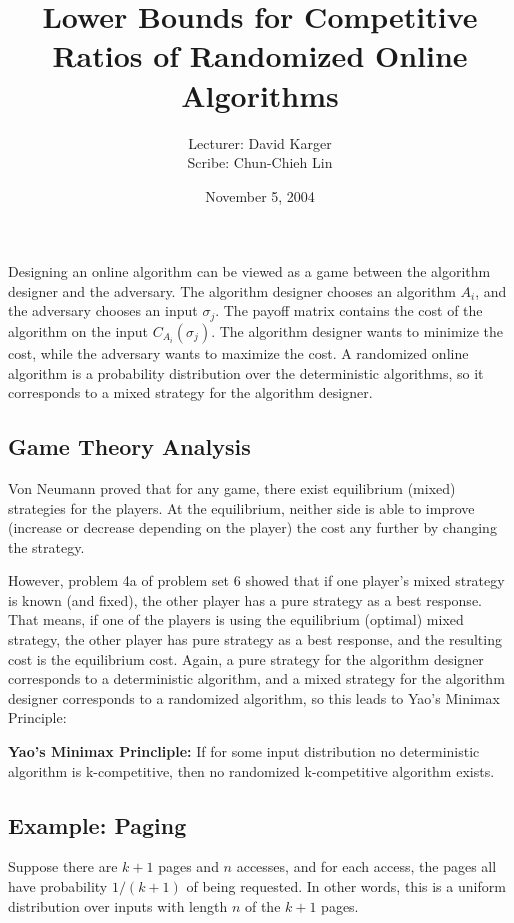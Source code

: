 \documentclass{article}
\title{Lower Bounds for Competitive Ratios of Randomized Online Algorithms}
\date{November 5, 2004}
\author{Lecturer: David Karger\\ Scribe: Chun-Chieh Lin}
\begin{document}
\maketitle

Designing an online algorithm can be viewed as a game between the algorithm designer and the adversary.  The algorithm designer chooses an algorithm $A_i$, and the adversary chooses an input $\sigma_j$.  The payoff matrix contains the cost of the algorithm on the input $C_{A_i}(\sigma_j)$.  The algorithm designer wants to minimize the cost, while the adversary wants to maximize the cost.  A randomized online algorithm is a probability distribution over the deterministic algorithms, so it corresponds to a mixed strategy for the algorithm designer.

\subsection{Game Theory Analysis}

Von Neumann proved that for any game, there exist equilibrium (mixed) strategies for the players.  At the equilibrium, neither side is able to improve (increase or decrease depending on the player) the cost any further by changing the strategy.

However, problem 4a of problem set 6 showed that if one player's mixed strategy is known (and fixed), the other player has a pure strategy as a best response.  That means, if one of the players is using the equilibrium (optimal) mixed strategy, the other player has pure strategy as a best response, and the resulting cost is the equilibrium cost.  Again, a pure strategy for the algorithm designer corresponds to a deterministic algorithm, and a mixed strategy for the algorithm designer corresponds to a randomized algorithm, so this leads to Yao's Minimax Principle:

\begin{theorem}
  \textbf{Yao's Minimax Princliple:} If for some input distribution no deterministic algorithm is k-competitive, then no randomized k-competitive algorithm exists.
\end{theorem}

\subsection{Example: Paging}

Suppose there are $k+1$ pages and $n$ accesses, and for each access, the pages all have probability $1/(k+1)$ of being requested.  In other words, this is a uniform distribution over inputs with length $n$ of the $k+1$ pages.
\end{document}
